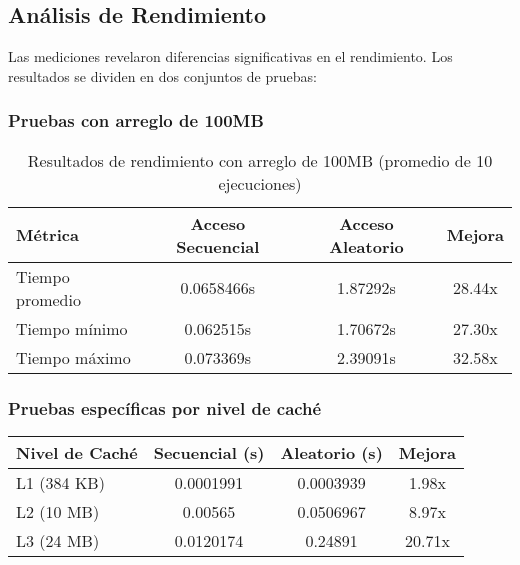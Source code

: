 \documentclass{article}
\begin{document}
\subsection{Análisis de Rendimiento}
Las mediciones revelaron diferencias significativas en el rendimiento. Los resultados se dividen en dos conjuntos de pruebas:

\subsubsection{Pruebas con arreglo de 100MB}
\begin{table}[!h]
\centering
\begin{tabular}{@{}lccc@{}}
\toprule
\textbf{Métrica} & \textbf{Acceso Secuencial} & \textbf{Acceso Aleatorio} & \textbf{Mejora} \\
\midrule
Tiempo promedio & 0.0658466s & 1.87292s & 28.44x \\
Tiempo mínimo & 0.062515s & 1.70672s & 27.30x \\
Tiempo máximo & 0.073369s & 2.39091s & 32.58x \\
\bottomrule
\end{tabular}
\caption{Resultados de rendimiento con arreglo de 100MB (promedio de 10 ejecuciones)}
\label{tab:results_100mb}
\end{table}

\vspace{1cm}

\subsubsection{Pruebas específicas por nivel de caché}
\begin{table}[!h]
\centering
\begin{tabular}{@{}lccc@{}}
\toprule
\textbf{Nivel de Caché} & \textbf{Secuencial (s)} & \textbf{Aleatorio (s)} & \textbf{Mejora} \\
\midrule
L1 (384 KB) & 0.0001991 & 0.0003939 & 1.98x \\
L2 (10 MB) & 0.00565 & 0.0506967 & 8.97x \\
L3 (24 MB) & 0.0120174 & 0.24891 & 20.71x \\
\bottomrule
\end{tabular}
\label{tab:results_cache}
\end{table}
\end{document}
